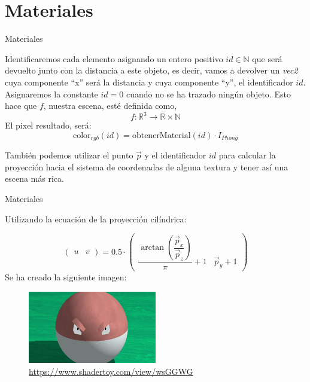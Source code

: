 \section{Materiales}

\SectionPage

\begin{frame}{Materiales}

    Identificaremos cada elemento asignando un entero positivo \(id \in \mathbb{N}\) que será devuelto junto con la distancia a este objeto, es decir, vamos a devolver un \textit{vec2} cuya componente \enquote{x} será la distancia y cuya componente \enquote{y}, el identificador \(id\). Asignaremos la constante \(id=0\) cuando no se ha trazado ningún objeto. Esto hace que \(f\), nuestra escena, esté definida como,
    \[f:\mathbb{R}^3\longrightarrow\mathbb{R}\times\mathbb{N}\]
    El pixel resultado, será:
    \[ \text{color}_{rgb}(id) = \text{obtenerMaterial}(id) \cdot I_{Phong} \]

    También podemos utilizar el punto \(\Vec{p}\) y el identificador \(id\) para calcular la proyección hacia el sistema de coordenadas de alguna textura y tener así una escena más rica.

\end{frame}


\begin{frame}{Materiales}

    Utilizando la ecuación de la proyección cilíndrica:
    
    \[\begin{pmatrix}
    u&
    v
\end{pmatrix}=  0.5\cdot
\begin{pmatrix}
    \dfrac{\arctan\left(\dfrac{\Vec{p}_x}{\Vec{p}_z}\right)}{\pi}+1&
    \Vec{p}_y + 1
\end{pmatrix}
\]
    Se ha creado la siguiente imagen:
    
    \vfill
    
    \begin{figure}[H]
      \centering
      \includegraphics[width=0.5\textwidth]{imagenes/voltorb.png}
      {\url{https://www.shadertoy.com/view/wsGGWG}}
    \end{figure}

\end{frame}